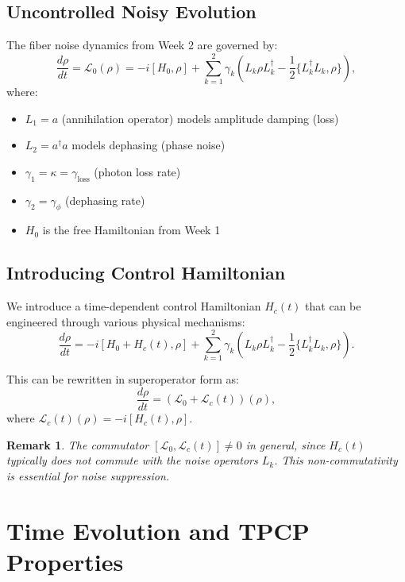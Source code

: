 \documentclass[11pt]{article}
\newtheorem{remark}[theorem]{Remark}
\begin{document}
\subsection{Uncontrolled Noisy Evolution}
The fiber noise dynamics from Week 2 are governed by:
\begin{equation}
\frac{d\rho}{dt} = \mathcal{L}_0(\rho) = -i[H_0, \rho] + \sum_{k=1}^2 \gamma_k \left( L_k \rho L_k^\dagger - \frac{1}{2}\{L_k^\dagger L_k, \rho\} \right),
\label{eq:uncontrolled}
\end{equation}
where:
\begin{itemize}
\item $L_1 = a$ (annihilation operator) models amplitude damping (loss)
\item $L_2 = a^\dagger a$ models dephasing (phase noise)
\item $\gamma_1 = \kappa = \gamma_{\text{loss}}$ (photon loss rate)
\item $\gamma_2 = \gamma_\phi$ (dephasing rate)
\item $H_0$ is the free Hamiltonian from Week 1
\end{itemize}

\subsection{Introducing Control Hamiltonian}
We introduce a time-dependent control Hamiltonian $H_c(t)$ that can be engineered through various physical mechanisms:
\begin{equation}
\frac{d\rho}{dt} = -i[H_0 + H_c(t), \rho] + \sum_{k=1}^2 \gamma_k \left( L_k \rho L_k^\dagger - \frac{1}{2}\{L_k^\dagger L_k, \rho\} \right).
\label{eq:controlled}
\end{equation}

This can be rewritten in superoperator form as:
\begin{equation}
\frac{d\rho}{dt} = (\mathcal{L}_0 + \mathcal{L}_c(t))(\rho),
\label{eq:superoperator}
\end{equation}
where $\mathcal{L}_c(t)(\rho) = -i[H_c(t), \rho]$.

\begin{remark}
The commutator $[\mathcal{L}_0, \mathcal{L}_c(t)] \neq 0$ in general, since $H_c(t)$ typically does not commute with the noise operators $L_k$. This non-commutativity is essential for noise suppression.
\end{remark}

\section{Time Evolution and TPCP Properties}
\end{document}
